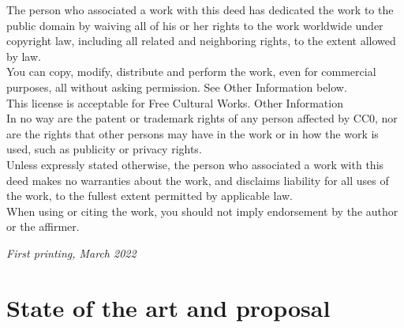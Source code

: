 \documentclass[
	12pt, %
	fleqn, %
	a4paper, %
	oneside, %
]{LegrandOrangeBook}
\begin{document}
\noindent The person who associated a work with this deed has dedicated the work to the public domain by waiving all of his or her rights to the work worldwide under copyright law, including all related and neighboring rights, to the extent allowed by law.\\
You can copy, modify, distribute and perform the work, even for commercial purposes, all without asking permission. See Other Information below.\\
This license is acceptable for Free Cultural Works.
Other Information\\
In no way are the patent or trademark rights of any person affected by CC0, nor are the rights that other persons may have in the work or in how the work is used, such as publicity or privacy rights.\\
Unless expressly stated otherwise, the person who associated a work with this deed makes no warranties about the work, and disclaims liability for all uses of the work, to the fullest extent permitted by applicable law.\\
When using or citing the work, you should not imply endorsement by the author or the affirmer.



\noindent \textit{First printing, March 2022} %


\pagestyle{empty} %

\tableofcontents %

\listoffigures %

\listoftables %

\pagestyle{fancy} %

\cleardoublepage %


\part{State of the art and proposal}
\end{document}
